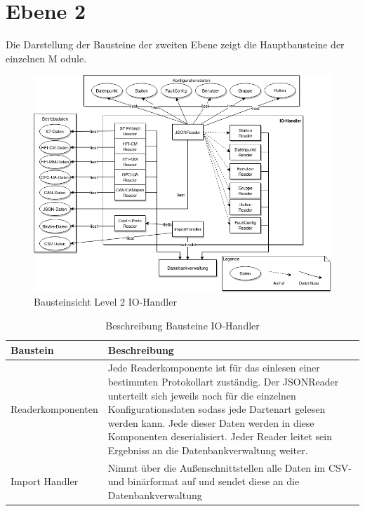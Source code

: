 \section{Ebene 2}
Die Darstellung der Bausteine der zweiten Ebene zeigt die Hauptbausteine der einzelnen M
odule.
\begin{figure}[h]
	\centering
	\includegraphics[width=1\textwidth]{Graphics/bausteinansicht_ebene_2_IO-Modul.png}
	\caption{Bausteinsicht Level 2 IO-Handler}
	\label{fig:bausteinsichtlvl2_modulIO}
\end{figure}                 

\begin{table}[t]
	\begin{tabularx}{\textwidth}{|p{5cm}| X|}
		\hline
		Baustein & Beschreibung\\
		\hline
		Readerkomponenten & Jede Readerkomponente ist für das einlesen einer bestimmten Protokollart zuständig. Der JSONReader unterteilt sich jeweils noch für die einzelnen Konfigurationsdaten sodass jede Dartenart gelesen werden kann. Jede dieser Daten werden in diese Komponenten deserialisiert. Jeder Reader leitet sein Ergebniss an die Datenbankverwaltung weiter. \\
		\hline
		Import Handler &  Nimmt über die Außenschnittstellen alle Daten im CSV- und binärformat auf und sendet diese an die Datenbankverwaltung\\
		\hline
	\end{tabularx} 
	\caption{Beschreibung Bausteine IO-Handler}	\label{tab:IOHandlerBeschreibung}
\end{table}

